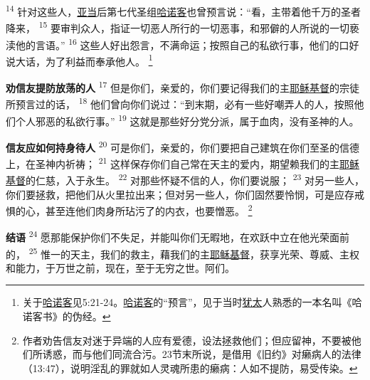 \textsuperscript{14}
针对这些人，\uline{亚当}后第七代圣组\uline{哈诺客}也曾预言说：“看，主带着他千万的圣者降来，
\textsuperscript{15}
要审判众人，指证一切恶人所行的一切恶事，和邪僻的人所说的一切亵渎他的言语。”
\textsuperscript{16}
这些人好出怨言，不满命运；按照自己的私欲行事，他们的口好说大话，为了利益而奉承他人。
\footnote{关于\uline{哈诺客}见5:21-24。\uline{哈诺客}的“预言”，见于当时\uline{犹太}人熟悉的一本名叫《哈诺客书》的伪经。}

\textbf{劝信友提防放荡的人\quad}
\textsuperscript{17}
但是你们，亲爱的，你们要记得我们的主\uline{耶稣}\uline{基督}的宗徒所预言过的话，
\textsuperscript{18}
他们曾向你们说过：“到末期，必有一些好嘲弄人的人，按照他们个人邪恶的私欲行事。”
\textsuperscript{19}
这就是那些好分党分派，属于血肉，没有圣神的人。

\textbf{信友应如何持身待人\quad}
\textsuperscript{20}
可是你们，亲爱的，你们要把自己建筑在你们至圣的信德上，在圣神内祈祷；
\textsuperscript{21}
这样保存你们自己常在天主的爱内，期望赖我们的主\uline{耶稣}\uline{基督}的仁慈，入于永生。
\textsuperscript{22}
对那些怀疑不信的人，你们要说服；
\textsuperscript{23}
对另一些人，你们要拯救，把他们从火里拉出来；但对另一些人，你们固然要怜悯，可是应存戒惧的心，甚至连他们肉身所玷污了的内衣，也要憎恶。
\footnote{作者劝告信友对迷于异端的人应有爱德，设法拯救他们；但应留神，不要被他们所诱惑，而与他们同流合污。23节末所说，是借用《旧约》对癞病人的法律（13:47），说明淫乱的罪就如人灵魂所患的癞病：人如不提防，易受传染。}

\textbf{结语\quad}
\textsuperscript{24}
愿那能保护你们不失足，并能叫你们无暇地，在欢跃中立在他光荣面前的，
\textsuperscript{25}
惟一的天主，我们的救主，藉我们的主\uline{耶稣}\uline{基督}，获享光荣、尊威、主权和能力，于万世之前，现在，至于无穷之世。阿们。
